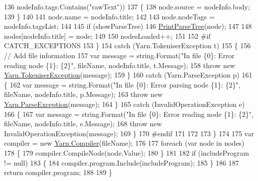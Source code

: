 \begin{DoxyCode}
136                         nodeInfo.tags.Contains(\textcolor{stringliteral}{"rawText"}))
137                     \{
138                         node.source = nodeInfo.body;
139                     \}
140 
141                     node.name = nodeInfo.title;
142 
143                     node.nodeTags = nodeInfo.tagsList;
144 
145                     \textcolor{keywordflow}{if} (showParseTree)
146                         \hyperlink{a00107_aa105ea8e5d65a420d1089616523feecc}{PrintParseTree}(node);
147 
148                     nodes[nodeInfo.title] = node;
149 
150                     nodesLoaded++;
151 
152 \textcolor{preprocessor}{#if CATCH\_EXCEPTIONS}
153 \textcolor{preprocessor}{}                \}
154                 \textcolor{keywordflow}{catch} (Yarn.TokeniserException t)
155                 \{
156                     \textcolor{comment}{// Add file information}
157                     var message = string.Format(\textcolor{stringliteral}{"In file \{0\}: Error reading node \{1\}: \{2\}"}, fileName, 
      nodeInfo.title, t.Message);
158                     \textcolor{keywordflow}{throw} \textcolor{keyword}{new} \hyperlink{a00150}{Yarn.TokeniserException}(message);
159                 \}
160                 \textcolor{keywordflow}{catch} (Yarn.ParseException p)
161                 \{
162                     var message = string.Format(\textcolor{stringliteral}{"In file \{0\}: Error parsing node \{1\}: \{2\}"}, fileName, 
      nodeInfo.title, p.Message);
163                     \textcolor{keywordflow}{throw} \textcolor{keyword}{new} \hyperlink{a00121}{Yarn.ParseException}(message);
164                 \}
165                 \textcolor{keywordflow}{catch} (InvalidOperationException e)
166                 \{
167                     var message = string.Format(\textcolor{stringliteral}{"In file \{0\}: Error reading node \{1\}: \{2\}"}, fileName, 
      nodeInfo.title, e.Message);
168                     \textcolor{keywordflow}{throw} \textcolor{keyword}{new} InvalidOperationException(message);
169                 \}
170 \textcolor{preprocessor}{#endif}
171 \textcolor{preprocessor}{}
172 
173             \}
174 
175             var compiler = \textcolor{keyword}{new} \hyperlink{a00034}{Yarn.Compiler}(fileName);
176 
177             \textcolor{keywordflow}{foreach} (var node \textcolor{keywordflow}{in} nodes)
178             \{
179                 compiler.CompileNode(node.Value);
180             \}
181 
182             \textcolor{keywordflow}{if} (includeProgram != null)
183             \{
184                 compiler.program.Include(includeProgram);
185             \}
186 
187             \textcolor{keywordflow}{return} compiler.program;
188 
189         \}
\end{DoxyCode}
